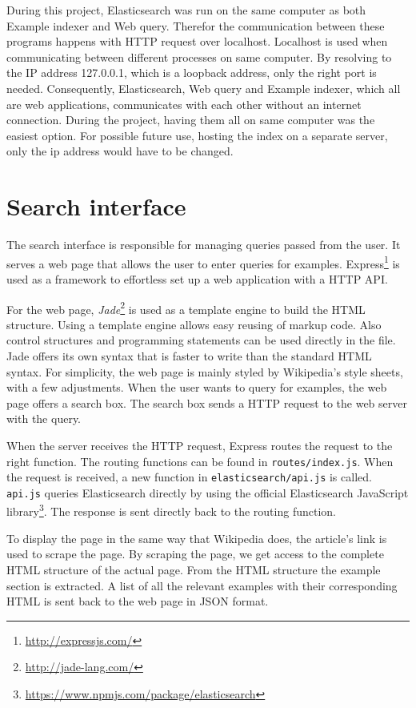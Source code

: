 During this project, Elasticsearch was run on the same computer as both Example indexer and Web query. Therefor the communication between these programs happens with HTTP request over localhost. Localhost is used when communicating between different processes on same computer. By resolving to the IP address 127.0.0.1, which is a loopback address, only the right port is needed. Consequently, Elasticsearch, Web query and Example indexer, which all are web applications, communicates with each other without an internet connection. During the project, having them all on same computer was the easiest option. For possible future use, hosting the index on a separate server, only the ip address would have to be changed.

\section{Search interface}
The search interface is responsible for managing queries passed from the user. It serves a web page that allows the user to enter queries for examples. Express\footnote{\url{http://expressjs.com/}} is used as a framework to effortless set up a web application with a HTTP API.

For the web page, \textit{Jade}\footnote{\url{http://jade-lang.com/}} is used as a template engine to build the HTML structure. Using a template engine allows easy reusing of markup code. Also control structures and programming statements can be used directly in the file. Jade offers its own syntax that is faster to write than the standard HTML syntax. For simplicity, the web page is mainly styled by Wikipedia's style sheets, with a few adjustments. When the user wants to query for examples, the web page offers a search box. The search box sends a HTTP request to the web server with the query.

When the server receives the HTTP request, Express routes the request to the right function. The routing functions can be found in \texttt{routes/index.js}. 
When the request is received, a new function in \texttt{elasticsearch/api.js} is called. \texttt{api.js} queries Elasticsearch directly by using the official Elasticsearch JavaScript  library\footnote{\url{https://www.npmjs.com/package/elasticsearch}}. The response is sent directly back to the routing function.

To display the page in the same way that Wikipedia does, the article's link is used to scrape the page. By scraping the page, we get access to the complete HTML structure of the actual page. From the HTML structure the example section is extracted. A list of all the relevant examples with their corresponding HTML is sent back to the web page in JSON format. 


